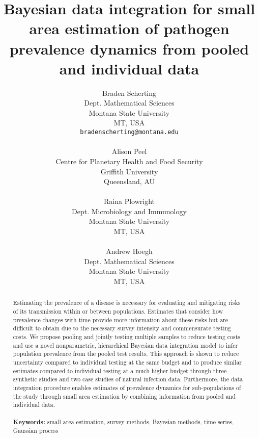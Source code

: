 \documentclass{article}
\title{Bayesian data integration for small area estimation of pathogen prevalence dynamics from pooled and individual data}
\author{
  Braden Scherting \\
  Dept. Mathematical Sciences \\
  Montana State University \\
  MT, USA \\
  \texttt{bradenscherting@montana.edu} \\
\\
  Alison Peel \\
  Centre for Planetary Health and Food Security \\
  Griffith University \\
  Queensland, AU\\
\\
  Raina Plowright \\
  Dept. Microbiology and Immunology \\
  Montana State University \\
  MT, USA\\
\\
  Andrew Hoegh \\
  Dept. Mathematical Sciences \\
  Montana State University \\
  MT, USA \\}
\begin{document}
\maketitle


\begin{abstract}
Estimating the prevalence of a disease is necessary for evaluating and mitigating risks of its transmission within or between populations. Estimates that consider how prevalence changes with time provide more information about these risks but are difficult to obtain due to the necessary survey intensity and commensurate testing costs. We propose pooling and jointly testing multiple samples to reduce testing costs and use a novel nonparametric, hierarchical Bayesian data integration model to infer population prevalence from the pooled test results. This approach is shown to reduce uncertainty compared to individual testing at the same budget and to produce similar estimates compared to individual testing at a much higher budget through three synthetic studies and two case studies of natural infection data. Furthermore, the data integration procedure enables estimates of prevalence dynamics for sub-populations of the study through small area estimation by combining information from pooled and individual data.\\
\\
{\bf Keywords:} small area estimation, survey methods, Bayesian methods, time series, Gaussian process
\end{abstract}
\end{document}
